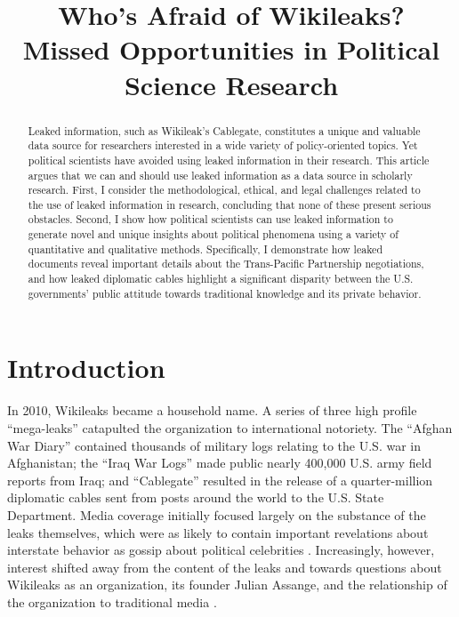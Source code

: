 \documentclass[12pt]{article}
\title{Who's Afraid of Wikileaks? \\ \vspace{2 mm} \large Missed Opportunities in Political Science Research}
\begin{document}
\maketitle

\doublespacing

\begin{abstract}
Leaked information, such as Wikileak's Cablegate, constitutes a unique and valuable data source for researchers
interested in a wide variety of policy-oriented topics. Yet political scientists have avoided using
leaked information in their research. This article argues that we can and should use leaked information 
as a data source in scholarly research. First, I consider the
methodological, ethical, and legal challenges related to the use of leaked information in research, concluding 
that none of these present serious obstacles. 
Second, I show how political scientists can use leaked information to generate novel and unique 
insights about political phenomena using a variety of quantitative and qualitative methods. Specifically, 
I demonstrate how leaked documents reveal important details about the Trans-Pacific Partnership 
negotiations, and how leaked diplomatic cables highlight a significant disparity between the U.S. governments' 
public attitude towards traditional knowledge and its private behavior.
\end{abstract}

\section{Introduction}

In 2010, Wikileaks became a household name. A series of three high profile ``mega-leaks'' 
catapulted the organization to international notoriety.
The ``Afghan War Diary'' contained thousands of military logs relating to the U.S. war in Afghanistan;
the ``Iraq War Logs'' made public nearly 400,000 U.S. 
army field reports from Iraq; and ``Cablegate'' resulted in the release of a quarter-million 
diplomatic cables sent from posts around the world to the U.S. State Department.
Media coverage initially focused largely on the substance of the leaks themselves, which were as likely to contain 
important revelations about interstate behavior as gossip about political celebrities \citep{shane2010wikileaks,hooper2010silvio}.
Increasingly, however, interest shifted away from the content of the leaks and towards questions 
about Wikileaks as an organization, its founder Julian Assange, and the relationship of the organization 
to traditional media \citep{saunders2011wikileaks,benkler2011free}.
\end{document}
